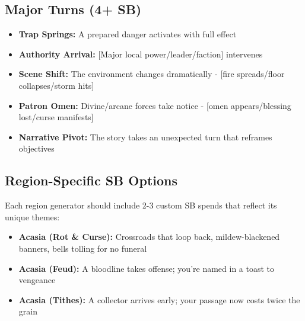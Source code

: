 \subsection*{Major Turns (4+ SB)}
\begin{itemize}
\item \textbf{Trap Springs:} A prepared danger activates with full effect
\item \textbf{Authority Arrival:} [Major local power/leader/faction] intervenes
\item \textbf{Scene Shift:} The environment changes dramatically - [fire spreads/floor collapses/storm hits]
\item \textbf{Patron Omen:} Divine/arcane forces take notice - [omen appears/blessing lost/curse manifests]
\item \textbf{Narrative Pivot:} The story takes an unexpected turn that reframes objectives
\end{itemize}

\subsection*{Region-Specific SB Options}
Each region generator should include 2-3 custom SB spends that reflect its unique themes:

\begin{itemize}
\item \textbf{Acasia (Rot \& Curse):} Crossroads that loop back, mildew-blackened banners, bells tolling for no funeral
\item \textbf{Acasia (Feud):} A bloodline takes offense; you're named in a toast to vengeance
\item \textbf{Acasia (Tithes):} A collector arrives early; your passage now costs twice the grain
\end{itemize}

